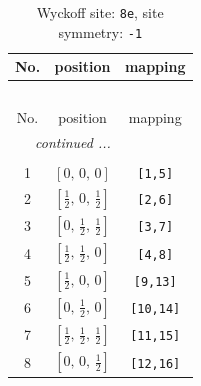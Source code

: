 \documentclass[fleqn,8pt]{jsarticle}
\begin{document}
\renewcommand{\arraystretch}{1.2}
\begin{longtable}{ccc}
\caption{Wyckoff site: {\tt 8e}, site symmetry: {\tt -1}}
 \\
 \hline \hline
No. & position & mapping \\ \hline \endfirsthead

\multicolumn{2}{l}{\tablename\ \thetable{}} \\
 \hline \hline
No. & position & mapping \\ \hline \endhead

 \hline \hline
\multicolumn{2}{r}{\footnotesize\it continued ...} \\ \endfoot

 \hline \hline
\multicolumn{2}{r}{} \\ \endlastfoot

1 & $\left[ 0,\, 0,\, 0 \right]$ & {\tt [1,5]} \\ \hline
2 & $\left[ \frac{1}{2},\, 0,\, \frac{1}{2} \right]$ & {\tt [2,6]} \\ \hline
3 & $\left[ 0,\, \frac{1}{2},\, \frac{1}{2} \right]$ & {\tt [3,7]} \\ \hline
4 & $\left[ \frac{1}{2},\, \frac{1}{2},\, 0 \right]$ & {\tt [4,8]} \\ \hline
5 & $\left[ \frac{1}{2},\, 0,\, 0 \right]$ & {\tt [9,13]} \\ \hline
6 & $\left[ 0,\, \frac{1}{2},\, 0 \right]$ & {\tt [10,14]} \\ \hline
7 & $\left[ \frac{1}{2},\, \frac{1}{2},\, \frac{1}{2} \right]$ & {\tt [11,15]} \\ \hline
8 & $\left[ 0,\, 0,\, \frac{1}{2} \right]$ & {\tt [12,16]} \\
\end{longtable}
\renewcommand{\arraystretch}{1.2}
\end{document}
